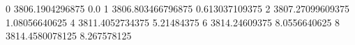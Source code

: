 0 3806.1904296875 0.0
1 3806.803466796875 0.613037109375
2 3807.27099609375 1.08056640625
4 3811.4052734375 5.21484375
6 3814.24609375 8.0556640625
8 3814.4580078125 8.267578125

